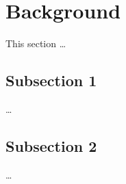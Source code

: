 

\section{Background}

    This section \ldots

    \subsection{Subsection 1}

        \ldots

    \subsection{Subsection 2}

        \ldots
